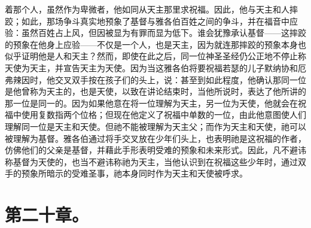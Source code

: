 着那个人，虽然作为卑微者，他如同从天主那里求祝福。因此，他与天主和人摔跤；如此，那场争斗真实地预象了基督与雅各伯百姓之间的争斗，并在福音中应验：虽然百姓占上风，但因被显为有罪而显为低下。谁会犹豫承认基督——这摔跤的预象在他身上应验——不仅是一个人，也是天主，因为就连那摔跤的预象本身也似乎证明他是人和天主？然而，即使在此之后，同一位神圣圣经仍公正地不停止称天使为天主，并宣告天主为天使。因为当这雅各伯将要祝福若瑟的儿子默纳协和厄弗辣因时，他交叉双手按在孩子们的头上，说：甚至到如此程度，他确认那同一位是他曾称为天主的，也是天使，以致在讲论结束时，当他所说时，表达了他所讲的那一位是同一的。因为如果他意在将一位理解为天主，另一位为天使，他就会在祝福中使用复数指两个位格；但现在他定义了祝福中单数的一位，由此他意图使人们理解同一位是天主和天使。但祂不能被理解为天主父；而作为天主和天使，祂可以被理解为基督。雅各伯通过将手交叉放在少年们头上，也表明祂是这祝福的作者，仿佛他们的父亲是基督，并藉此手形表明受难的预象和未来形式。因此，凡不避讳称基督为天使的，也当不避讳称祂为天主，当他认识到在祝福这些少年时，通过双手的预象所暗示的受难圣事，祂本身同时作为天主和天使被呼求。\par


\section{第二十章。}

\par

